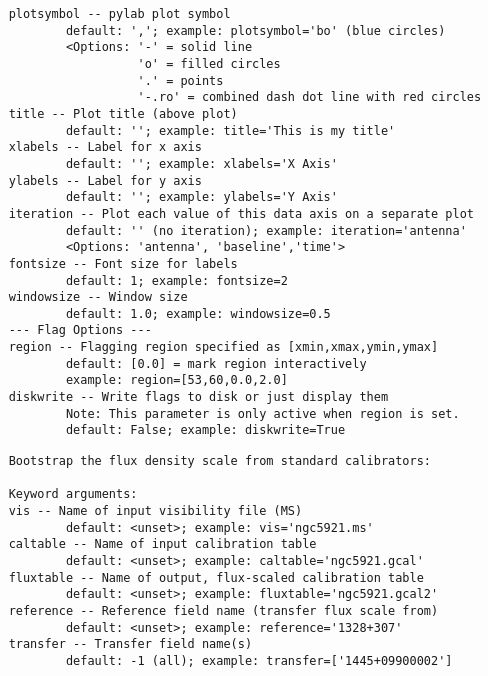 \begin{verbatim}
    plotsymbol -- pylab plot symbol
            default: ','; example: plotsymbol='bo' (blue circles)
            <Options: '-' = solid line
                      'o' = filled circles
                      '.' = points
                      '-.ro' = combined dash dot line with red circles
    title -- Plot title (above plot)
            default: ''; example: title='This is my title'
    xlabels -- Label for x axis
            default: ''; example: xlabels='X Axis'
    ylabels -- Label for y axis
            default: ''; example: ylabels='Y Axis'
    iteration -- Plot each value of this data axis on a separate plot
            default: '' (no iteration); example: iteration='antenna'
            <Options: 'antenna', 'baseline','time'>
    fontsize -- Font size for labels
            default: 1; example: fontsize=2
    windowsize -- Window size
            default: 1.0; example: windowsize=0.5
    --- Flag Options ---
    region -- Flagging region specified as [xmin,xmax,ymin,ymax]
            default: [0.0] = mark region interactively
            example: region=[53,60,0.0,2.0]
    diskwrite -- Write flags to disk or just display them
            Note: This parameter is only active when region is set.
            default: False; example: diskwrite=True
\end{verbatim}
\normalsize

\vspace{3mm}
\small
\begin{verbatim}
    Bootstrap the flux density scale from standard calibrators:
    
    Keyword arguments:
    vis -- Name of input visibility file (MS)
            default: <unset>; example: vis='ngc5921.ms'
    caltable -- Name of input calibration table
            default: <unset>; example: caltable='ngc5921.gcal'
    fluxtable -- Name of output, flux-scaled calibration table
            default: <unset>; example: fluxtable='ngc5921.gcal2'
    reference -- Reference field name (transfer flux scale from)
            default: <unset>; example: reference='1328+307'
    transfer -- Transfer field name(s)
            default: -1 (all); example: transfer=['1445+09900002']
\end{verbatim}
\normalsize

